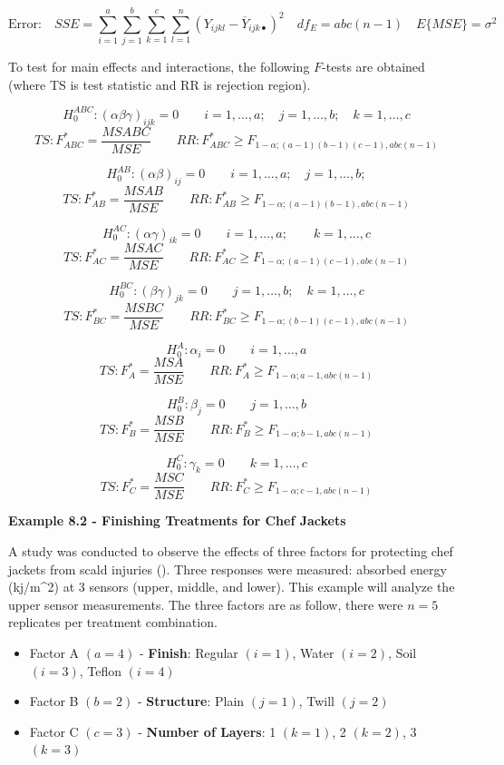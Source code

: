\documentclass[
]{book}
\providecommand{\tightlist}{%
  \setlength{\itemsep}{0pt}\setlength{\parskip}{0pt}}
\begin{document}
\[
\mbox{Error:} \quad SSE =
\sum_{i=1}^a\sum_{j=1}^b\sum_{k=1}^c\sum_{l=1}^n
\left(Y_{ijkl}-\overline{Y}_{ijk\bullet}\right)^2
\quad df_{E}=abc(n-1) \quad
E\{MSE\}=\sigma^2
\]

To test for main effects and interactions, the following \(F\)-tests are
obtained (where TS is test statistic and RR is rejection region).

\[
H_0^{ABC}: (\alpha\beta\gamma)_{ijk}=0 \qquad i=1,\ldots,a; \quad 
j=1,\ldots,b; \quad k=1,\ldots,c
\] \[
TS:F_{ABC}^*=\frac{MSABC}{MSE}  \qquad RR:F_{ABC}^* \ge
F_{1-\alpha;(a-1)(b-1)(c-1),abc(n-1)}
\]

\[
H_0^{AB}: (\alpha\beta)_{ij}=0 \qquad i=1,\ldots,a; \quad 
j=1,\ldots,b;
\] \[
TS:F_{AB}^*=\frac{MSAB}{MSE}  \qquad RR:F_{AB}^* \ge
F_{1-\alpha;(a-1)(b-1),abc(n-1)}
\]

\[
H_0^{AC}: (\alpha\gamma)_{ik}=0 \qquad i=1,\ldots,a; \quad 
\quad k=1,\ldots,c
\] \[
TS:F_{AC}^*=\frac{MSAC}{MSE}  \qquad RR:F_{AC}^* \ge
F_{1-\alpha;(a-1)(c-1),abc(n-1)}
\]

\[
H_0^{BC}: (\beta\gamma)_{jk}=0 \qquad  
j=1,\ldots,b; \quad k=1,\ldots,c
\] \[
TS:F_{BC}^*=\frac{MSBC}{MSE}  \qquad RR:F_{BC}^* \ge
F_{1-\alpha;(b-1)(c-1),abc(n-1)}
\]

\[
H_0^{A}: \alpha_i=0 \qquad i=1,\ldots,a
\] \[
TS:F_{A}^*=\frac{MSA}{MSE}  \qquad RR:F_{A}^* \ge
F_{1-\alpha;a-1,abc(n-1)}
\]

\[
H_0^{B}: \beta_j=0 \qquad  
j=1,\ldots,b
\] \[
TS:F_{B}^*=\frac{MSB}{MSE}  \qquad RR:F_{B}^* \ge
F_{1-\alpha;b-1,abc(n-1)}
\]

\[
H_0^{C}: \gamma_k=0 \qquad  k=1,\ldots,c
\] \[
TS:F_{C}^*=\frac{MSC}{MSE}  \qquad RR:F_{C}^* \ge
F_{1-\alpha;c-1,abc(n-1)}
\]

\textbf{Example 8.2 - Finishing Treatments for Chef Jackets}

A study was conducted to observe the effects of three factors for
protecting chef jackets from scald injuries
(). Three
responses were measured: absorbed energy (kj/m\^{}2) at 3 sensors
(upper, middle, and lower). This example will analyze the upper sensor
measurements. The three factors are as follow, there were \(n=5\)
replicates per treatment combination.

\begin{itemize}
\tightlist
\item
  Factor A \((a=4)\) - \textbf{Finish}: Regular \((i=1)\), Water
  \((i=2)\), Soil \((i=3)\), Teflon \((i=4)\)
\item
  Factor B \((b=2)\) - \textbf{Structure}: Plain \((j=1)\), Twill
  \((j=2)\)
\item
  Factor C \((c=3)\) - \textbf{Number of Layers}: 1 \((k=1)\), 2
  \((k=2)\), 3 \((k=3)\)
\end{itemize}
\end{document}
